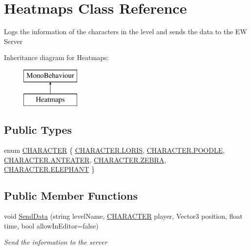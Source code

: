 \hypertarget{class_heatmaps}{}\section{Heatmaps Class Reference}
\label{class_heatmaps}


Logs the information of the characters in the level and sends the data to the EW Server  


Inheritance diagram for Heatmaps\+:\begin{figure}[H]
\begin{center}
\leavevmode
\includegraphics[height=2.000000cm]{class_heatmaps}
\end{center}
\end{figure}
\subsection*{Public Types}
\begin{DoxyCompactItemize}
\item 
enum \mbox{\hyperlink{class_heatmaps_a257e4582d0ae682783bce271d444d42b}{C\+H\+A\+R\+A\+C\+T\+ER}} \{ \newline
\mbox{\hyperlink{class_heatmaps_a257e4582d0ae682783bce271d444d42bae46a6b2ccd4807e2a594e6a8331302ea}{C\+H\+A\+R\+A\+C\+T\+E\+R.\+L\+O\+R\+IS}}, 
\mbox{\hyperlink{class_heatmaps_a257e4582d0ae682783bce271d444d42badb66ab1f1a2af9f3799020294905535f}{C\+H\+A\+R\+A\+C\+T\+E\+R.\+P\+O\+O\+D\+LE}}, 
\mbox{\hyperlink{class_heatmaps_a257e4582d0ae682783bce271d444d42ba1a64acf4a09b53327c86c667a607cd62}{C\+H\+A\+R\+A\+C\+T\+E\+R.\+A\+N\+T\+E\+A\+T\+ER}}, 
\mbox{\hyperlink{class_heatmaps_a257e4582d0ae682783bce271d444d42bae8629feac130bde1b4be34fa191e63ce}{C\+H\+A\+R\+A\+C\+T\+E\+R.\+Z\+E\+B\+RA}}, 
\newline
\mbox{\hyperlink{class_heatmaps_a257e4582d0ae682783bce271d444d42ba012a519d8d4096708f2f132e88aa7a8e}{C\+H\+A\+R\+A\+C\+T\+E\+R.\+E\+L\+E\+P\+H\+A\+NT}}
 \}
\end{DoxyCompactItemize}
\subsection*{Public Member Functions}
\begin{DoxyCompactItemize}
\item 
void \mbox{\hyperlink{class_heatmaps_a403bf4bb9a76cdb22442269821542d6a}{Send\+Data}} (string level\+Name, \mbox{\hyperlink{class_heatmaps_a257e4582d0ae682783bce271d444d42b}{C\+H\+A\+R\+A\+C\+T\+ER}} player, Vector3 position, float time, bool allow\+In\+Editor=false)
\begin{DoxyCompactList}\small\item\em Send the information to the server \end{DoxyCompactList}\end{DoxyCompactItemize}
